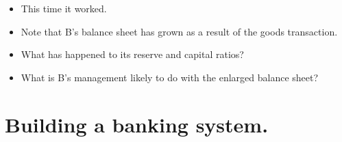 \documentclass[20pt]{article}
\begin{document}
\begin{itemize}
    \item This time it worked.
    \item Note that B's balance sheet has grown as a result of the goods transaction.
    \item What has happened to its reserve and capital ratios?
    \item What is B's management likely to do with the enlarged balance sheet?
\end{itemize}


\section{Building a banking system.}

\begin{screen}
\newpage
\end{screen}
\end{document}
